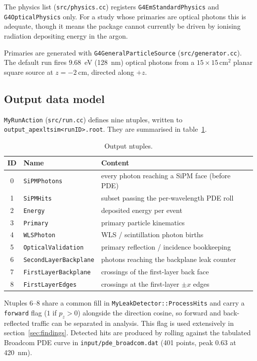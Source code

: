 \documentclass[a4paper,11pt]{article}
\begin{document}
The physics list (\texttt{src/physics.cc}) registers
\texttt{G4EmStandardPhysics} and \texttt{G4OpticalPhysics} only. For a study
whose primaries are optical photons this is adequate, though it means the
package cannot currently be driven by ionising radiation depositing energy in
the argon.

Primaries are generated with \texttt{G4GeneralParticleSource}
(\texttt{src/generator.cc}). The default run fires \SI{9.68}{\electronvolt}
(\SI{128}{\nano\meter}) optical photons from a $15\times15$\,cm$^2$ planar
square source at $z=\SI{-2}{\centi\meter}$, directed along $+z$.

\subsection{Output data model}

\texttt{MyRunAction} (\texttt{src/run.cc}) defines nine ntuples, written to
\texttt{output\_apexltsim<runID>.root}. They are summarised in
table~\ref{tab:ntuples}.

\begin{table}[htbp]
\centering
\caption{\label{tab:ntuples}Output ntuples.}
\begin{tabular}{cll}
\toprule
ID & Name & Content \\
\midrule
0 & \texttt{SiPMPhotons}          & every photon reaching a SiPM face (before PDE) \\
1 & \texttt{SiPMHits}             & subset passing the per-wavelength PDE roll \\
2 & \texttt{Energy}               & deposited energy per event \\
3 & \texttt{Primary}              & primary particle kinematics \\
4 & \texttt{WLSPhoton}            & WLS / scintillation photon births \\
5 & \texttt{OpticalValidation}    & primary reflection / incidence bookkeeping \\
6 & \texttt{SecondLayerBackplane} & photons reaching the backplane leak counter \\
7 & \texttt{FirstLayerBackplane}  & crossings of the first-layer back face \\
8 & \texttt{FirstLayerEdges}      & crossings at the first-layer $\pm x$ edges \\
\bottomrule
\end{tabular}
\end{table}

Ntuples 6--8 share a common fill in \texttt{MyLeakDetector::ProcessHits} and
carry a \texttt{forward} flag ($1$ if $p_z>0$) alongside the direction cosine,
so forward and back-reflected traffic can be separated in analysis. This flag is
used extensively in section~\ref{sec:findings}. Detected hits are produced by
rolling against the tabulated Broadcom PDE curve in
\texttt{input/pde\_broadcom.dat} (401 points, peak $0.63$ at \SI{420}{\nano\meter}).
\end{document}
